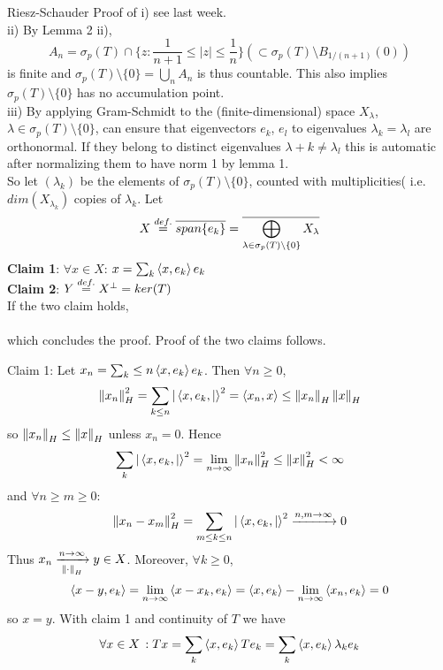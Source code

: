 \begin{pf}{Riesz-Schauder}{}
	Proof of i) see last week.\\
	ii) By Lemma 2 ii),
	$$A_n=\sigma_p(T)\cap\{z:\frac{1}{n+1}\leq|z|\leq\frac{1}{n}\}(\subset \sigma_p(T)\setminus B_{1/(n+1)}(0))$$
	is finite and $\sigma_p(T)\setminus\{0\}=\bigcup_n A_n$ is thus countable. This also implies $\sigma_p(T)\setminus\{0\}$ has no accumulation point.\\
	iii) By applying Gram-Schmidt to the (finite-dimensional) space $X_\lambda$, $\lambda\in\sigma_p(T)\setminus\{0\}$, can ensure that eigenvectors $e_k$, $e_l$ to eigenvalues $\lambda_k=\lambda_l$ are orthonormal. If they belong
	to distinct eigenvalues $\lambda+k\neq\lambda_l$ this is automatic after normalizing them to have norm 1 by lemma 1.\\
	So let $(\lambda_k)$ be the elements of $\sigma_p(T)\setminus\{0\}$, counted with multiplicities( i.e. $dim(X_{\lambda_k})$ copies of $\lambda_k$. Let
	$$
		X\stackrel{def.}{=}\overline{span\{e_k\}}=\overline{\bigoplus_{\lambda\in\sigma_p(T)\setminus\{0\}}X_\lambda}
	$$
	{\bf Claim 1}: $\forall x\in X$: $x=\sum_k \left<{x},{e_k}\right>e_k$\\
	{\bf Claim 2}: $Y\stackrel{def.}{=} X^\perp=ker(T)$\\
	If the two claim holds, \\
	\placeholder\\
	which concludes the proof. Proof of the two claims follows.
\end{pf}

\begin{pf}{Claim 1}{}: Let $x_n=\sum_k\leq n \left<{x},{e_k}\right>e_k$.
	Then $\forall n\geq0$,
	$$
		\left\|{x_n}\right\|_H^2=\sum_{k\leq n}|\left<{x,e_k},{|}\right>^2=\left<{x_n},{x}\right>\leq\left\|{x_n}\right\|_H\left\|{x}\right\|_H$$
	so $\left\|{x_n}\right\|_H\leq\left\|{x}\right\|_H$ unless $x_n=0$. Hence
	$$\sum_{k}|\left<{x,e_k},{|}\right>^2=\lim_{n\to\infty}\left\|{x_n}\right\|_H^2\leq\left\|{x}\right\|_H^2<\infty$$
	and $\forall n\geq m\geq0$:
	$$\left\|{x_n-x_m}\right\|^2_H=\sum_{m\leq k\leq n}|\left<{x,e_k},{|}\right>^2\xrightarrow{n,m\to\infty}0$$
	Thus $x_n\xrightarrow[\left\|{\cdot}\right\|_H]{n\to\infty}y\in X$. Moreover, $\forall k\geq 0$,
	$$\left<{x-y},{e_k}\right>=\lim_{n\to\infty}\left<{x-x_k},{e_k}\right>=\left<{x},{e_k}\right>-\lim_{n\to\infty}\left<{x_n},{e_k}\right>=0$$
	so $x=y$. With claim 1 and continuity of $T$ we have
	$$\forall x\in X\,: Tx=\sum_k \left<{x},{e_k}\right>Te_k=\sum_k \left<{x},{e_k}\right>\lambda_ke_k$$
\end{pf}

